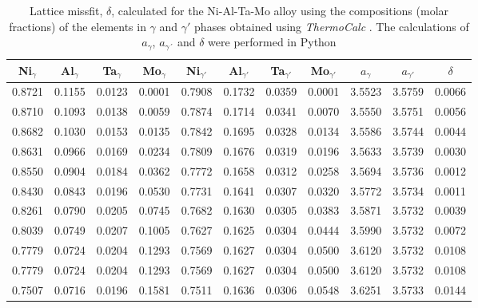 \begin{table}[H]
    \centering
    \begin{tabular}{rrrrrrrrrrr}
        \multicolumn{1}{c}{Ni$_\gamma$} & \multicolumn{1}{c}{Al$_\gamma$} & \multicolumn{1}{c}{Ta$_\gamma$} & \multicolumn{1}{c}{Mo$_\gamma$} & \multicolumn{1}{c}{Ni$_{\gamma'}$} & \multicolumn{1}{c}{Al$_{\gamma'}$} & \multicolumn{1}{c}{Ta$_{\gamma'}$} & \multicolumn{1}{c}{Mo$_{\gamma'}$} & \multicolumn{1}{c}{$a_\gamma$} & \multicolumn{1}{c}{$a_{\gamma'}$} & \multicolumn{1}{c}{$\delta$} \\ \hline \hline
        0.8721 & 0.1155 & 0.0123 & 0.0001 & 0.7908 & 0.1732 & 0.0359 & 0.0001 & 3.5523 & 3.5759 & 0.0066 \\0.8710 & 0.1093 & 0.0138 & 0.0059 & 0.7874 & 0.1714 & 0.0341 & 0.0070 & 3.5550 & 3.5751 & 0.0056 \\0.8682 & 0.1030 & 0.0153 & 0.0135 & 0.7842 & 0.1695 & 0.0328 & 0.0134 & 3.5586 & 3.5744 & 0.0044 \\0.8631 & 0.0966 & 0.0169 & 0.0234 & 0.7809 & 0.1676 & 0.0319 & 0.0196 & 3.5633 & 3.5739 & 0.0030 \\0.8550 & 0.0904 & 0.0184 & 0.0362 & 0.7772 & 0.1658 & 0.0312 & 0.0258 & 3.5694 & 3.5736 & 0.0012 \\0.8430 & 0.0843 & 0.0196 & 0.0530 & 0.7731 & 0.1641 & 0.0307 & 0.0320 & 3.5772 & 3.5734 & 0.0011 \\0.8261 & 0.0790 & 0.0205 & 0.0745 & 0.7682 & 0.1630 & 0.0305 & 0.0383 & 3.5871 & 3.5732 & 0.0039 \\0.8039 & 0.0749 & 0.0207 & 0.1005 & 0.7627 & 0.1625 & 0.0304 & 0.0444 & 3.5990 & 3.5732 & 0.0072 \\0.7779 & 0.0724 & 0.0204 & 0.1293 & 0.7569 & 0.1627 & 0.0304 & 0.0500 & 3.6120 & 3.5732 & 0.0108 \\0.7779 & 0.0724 & 0.0204 & 0.1293 & 0.7569 & 0.1627 & 0.0304 & 0.0500 & 3.6120 & 3.5732 & 0.0108 \\0.7507 & 0.0716 & 0.0196 & 0.1581 & 0.7511 & 0.1636 & 0.0306 & 0.0548 & 3.6251 & 3.5733 & 0.0144
    \end{tabular}
    \caption{Lattice missfit, $\delta$, calculated for the Ni-Al-Ta-Mo alloy using the compositions (molar fractions) of the elements in $\gamma$ and $\gamma'$ phases obtained using \textit{ThermoCalc} \citep{thermocalc}. The calculations of $a_\gamma$, $a_{\gamma´}$ and $\delta$ were performed in Python \citep{mygit}}
    \label{tab:tab05}
\end{table}


